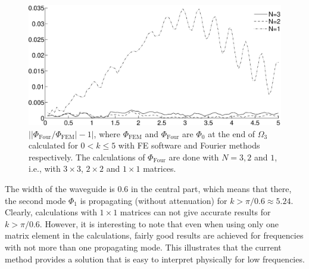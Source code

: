 \documentclass[numreferences]{kluwer}
\providecommand{\abs}[1]{\left\lvert#1\right\rvert}
\renewcommand{\Phi}{\varPhi}
\renewcommand{\Phi}{\varPhi}
\begin{document}
\begin{figure}[htb]
  \centering
  \includegraphics[width=\linewidth]{relerr123}
  \caption{$\abs{\abs{\Phi_{\text{Four}}/\Phi_{\text{FEM}}}-1}$, where
    $\Phi_{\text{FEM}}$ and $\Phi_{\text{Four}}$ are $\Phi_0$ at the
    end of $\Omega_3$ calculated for $0<k\le5$ with FE software and
    Fourier methods respectively. The calculations of
    $\Phi_{\text{Four}}$ are done with $N=3,2$ and $1$, i.e., with
    $3\times3$, $2\times2$ and $1\times1$ matrices.}
  \label{fig:relerr123}
\end{figure}

The width of the waveguide is $0.6$ in the central part, which means
that there, the second mode $\Phi_1$ is propagating (without
attenuation) for $k>\pi/0.6\approx5.24$. Clearly, calculations with
$1\times1$ matrices can not give accurate results for $k>\pi/0.6$.
However, it is interesting to note that even when using only one
matrix element in the calculations, fairly good results are achieved
for frequencies with not more than one propagating mode. This illustrates that the current method provides a solution that is easy to interpret physically for low frequencies.
\end{document}
